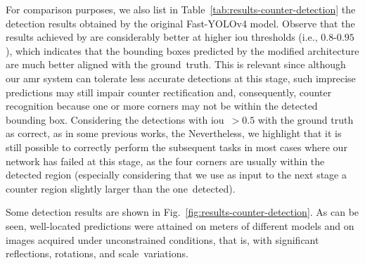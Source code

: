 For comparison purposes, we also list in Table~\ref{tab:results-counter-detection} the detection results obtained by the original Fast-YOLOv4 model. 
Observe that the results achieved by \detnet are considerably better at higher \gls*{iou} thresholds (i.e., $0.8$-$0.95$), which indicates that the bounding boxes predicted by the modified architecture are much better aligned with the ground~truth.
This is relevant since although our \gls*{amr} system can tolerate less accurate detections at this stage, such imprecise predictions may still impair counter rectification and, consequently, counter recognition because one or more corners may not be within the detected bounding box.
Considering the detections with \gls*{iou}~$> 0.5$ with the ground truth as correct, as in some previous works, the \detnet {}
Nevertheless, we highlight that it is still possible to correctly perform the subsequent tasks in most cases where our network has failed at this stage, as the four corners are usually within the detected region (especially considering that we use as input to the next stage a counter region slightly larger than the one~detected).

Some detection results are shown in Fig.~\ref{fig:results-counter-detection}.
As can be seen, well-located predictions were attained on meters of different models and on images acquired under unconstrained conditions, that is, with significant reflections, rotations, and scale~variations.

